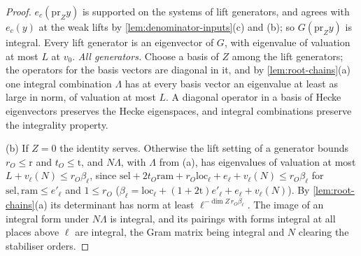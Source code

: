 \begin{proof}
$e_c(\mathrm{pr}_Zy)$ is supported on the systems of lift generators, and agrees with $e_c(y)$ at the weak lifts by \cref{lem:denominator-inputs}(c) and (b); so $G(\mathrm{pr}_Zy)$ is integral. Every lift generator is an eigenvector of $G$, with eigenvalue of valuation at
most $L$ at $v_0$. \emph{All generators.} Choose a basis of $Z$ among the lift generators; the operators for the basis vectors are diagonal in it, and by \cref{lem:root-chains}(a) one integral combination $\Lambda$ has at every basis vector an eigenvalue at least as
large in norm, of valuation at most $L$. A diagonal operator in a basis of Hecke eigenvectors preserves the Hecke eigenspaces, and integral combinations preserve the integrality property.

(b) If $Z=0$ the identity serves. Otherwise the lift setting of a generator bounds $r_O\le\mathrm r$ and $t_O\le\mathrm t$, and $N\Lambda$, with $\Lambda$ from (a), has eigenvalues of valuation at most $L+v_\ell(N)\le r_O\beta_\ell$, since
$\mathrm{sel}+2t_O\mathrm{ram}+r_O\mathrm{loc}_\ell+e_\ell+v_\ell(N)\le r_O\beta_\ell$ for $\mathrm{sel},\mathrm{ram}\le e'_\ell$ and $1\le r_O$ ($\beta_\ell=\mathrm{loc}_\ell+(1+2\mathrm t)e'_\ell+e_\ell+v_\ell(N)$). By \cref{lem:root-chains}(a) its determinant has norm at least $\ell^{-\dim Z\,r_O\beta_\ell}$. The image of an integral form under
$N\Lambda$ is integral, and its pairings with forms integral at all places above $\ell$ are integral, the Gram matrix being integral and $N$ clearing the stabiliser orders.
\end{proof}
